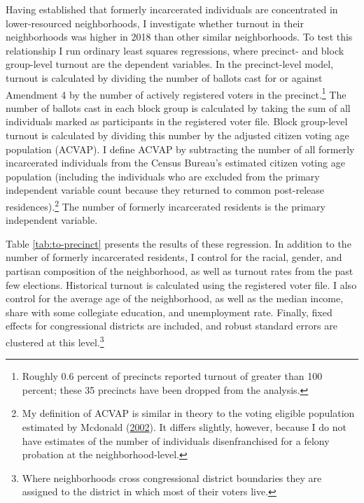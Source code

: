 \documentclass[
  12pt,
]{article}
\begin{document}
Having established that formerly incarcerated individuals are concentrated in lower-resourced neighborhoods, I investigate whether turnout in their neighborhoods was higher in 2018 than other similar neighborhoods. To test this relationship I run ordinary least squares regressions, where precinct- and block group-level turnout are the dependent variables. In the precinct-level model, turnout is calculated by dividing the number of ballots cast for or against Amendment 4 by the number of actively registered voters in the precinct.\footnote{Roughly 0.6 percent of precincts reported turnout of greater than 100 percent; these 35 precincts have been dropped from the analysis.} The number of ballots cast in each block group is calculated by taking the sum of all individuals marked as participants in the registered voter file. Block group-level turnout is calculated by dividing this number by the adjusted citizen voting age population (ACVAP). I define ACVAP by subtracting the number of all formerly incarcerated individuals from the Census Bureau's estimated citizen voting age population (including the individuals who are excluded from the primary independent variable count because they returned to common post-release residences).\footnote{My definition of ACVAP is similar in theory to the voting eligible population estimated by Mcdonald (\protect\hyperlink{ref-Mcdonald2002}{2002}). It differs slightly, however, because I do not have estimates of the number of individuals disenfranchised for a felony probation at the neighborhood-level.} The number of formerly incarcerated residents is the primary independent variable.

Table \ref{tab:to-precinct} presents the results of these regression. In addition to the number of formerly incarcerated residents, I control for the racial, gender, and partisan composition of the neighborhood, as well as turnout rates from the past few elections. Historical turnout is calculated using the registered voter file. I also control for the average age of the neighborhood, as well as the median income, share with some collegiate education, and unemployment rate. Finally, fixed effects for congressional districts are included, and robust standard errors are clustered at this level.\footnote{Where neighborhoods cross congressional district boundaries they are assigned to the district in which most of their voters live.}

\begin{singlespace}


\end{singlespace}
\end{document}
